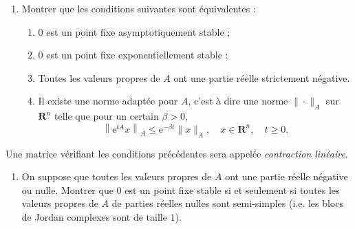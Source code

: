 \documentclass[a4paper,10pt,openany]{article}
\theoremstyle{plain}
\theoremstyle{definition}
\newcommand{\e}{\mathrm{e}}
\newcommand{\R}{\mathbf{R}}
\begin{document}
\begin{enumerate}
\item Montrer que les conditions suivantes sont \'equivalentes :
\begin{enumerate}[label=(\roman*)]
\item $0$ est un point fixe asymptotiquement stable ;
\item $0$ est un point fixe exponentiellement stable ;
\item Toutes les valeurs propres de $A$ ont une partie r\'eelle strictement n\'egative.
\item Il existe une norme adapt\'ee pour $A$, c'est \`a dire une norme $\|\cdot\|_A$ sur $\R^n$ telle que pour un certain $\beta > 0$,
$$
\left\|\e^{tA}x\right\|_A \leq \e^{-\beta t} \|x\|_A, \quad x \in \R^n, \quad t \geq 0.
$$
\end{enumerate}
\end{enumerate}
Une matrice v\'erifiant les conditions pr\'ec\'edentes sera appel\'ee \textit{contraction lin\'eaire}.
\begin{enumerate}[resume]
\item On suppose que toutes les valeurs propres de $A$ ont une partie r\'eelle n\'egative ou nulle. Montrer que $0$ est un point fixe stable si et seulement si toutes les valeurs propres de $A$ de parties r\'eelles nulles sont semi-simples (i.e. les blocs de Jordan complexes sont de taille $1$).
\end{enumerate}
\vspace{0.6cm}

 \vspace{1.5mm} 
\end{document}
